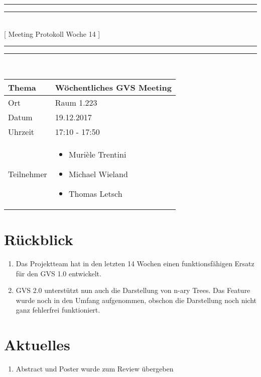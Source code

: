 \documentclass[11pt, a4paper,oneside]{scrartcl}
\begin{document}
	\centering
	\rule{\textwidth}{1.6pt}\vspace*{-\baselineskip}\vspace*{2pt} %
	\rule{\textwidth}{0.4pt}\\[\baselineskip] %
	{\LARGE [ Meeting Protokoll Woche 14 ]}\\[0.2\baselineskip] %
	\rule{\textwidth}{0.4pt}\vspace*{-\baselineskip}\vspace{3.2pt} %
	\rule{\textwidth}{1.6pt}\\[2\baselineskip] %
	
	\begin{tabu} to \linewidth {l X }
		\toprule
		\textbf{Thema} & \textbf{Wöchentliches GVS Meeting} \\
		\midrule
		Ort & Raum 1.223 \\
		Datum & 19.12.2017  \\
		Uhrzeit &  17:10 - 17:50  \\
		Teilnehmer & 
		\begin{minipage}[t]{\textwidth}
			\begin{itemize}
				\item Murièle Trentini
				\item Michael Wieland
				\item Thomas Letsch
			\end{itemize}
		\end{minipage}
		\\
		\bottomrule
	\end{tabu}
	
	
	\section{Rückblick}
	\begin{enumerate}
		\item Das Projektteam hat in den letzten 14 Wochen einen funktionsfähigen Ersatz für den GVS 1.0 entwickelt.
		\item GVS 2.0 unterstützt nun auch die Darstellung von n-ary Trees. Das Feature wurde noch in den Umfang aufgenommen, obschon die Darstellung noch nicht ganz fehlerfrei funktioniert. 
	\end{enumerate}
	
	\section{Aktuelles}
	\begin{enumerate}
		\item Abstract und Poster wurde zum Review übergeben
	\end{enumerate} 
	
\end{document}
